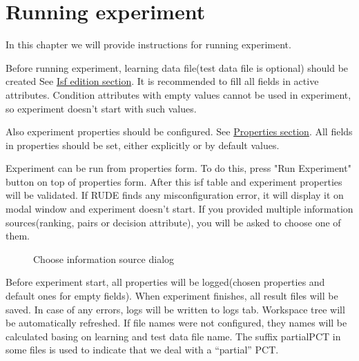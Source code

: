 \section{Running experiment}\label{section:experiment-running}

In this chapter we will provide instructions for running experiment.

Before running experiment, learning data file(test data file is optional) should be created See \hyperref[section:isf-table]{Isf edition section}. It is recommended to fill all fields in active attributes. Condition attributes with empty values cannot be used in experiment, so experiment doesn't start with such values.

Also experiment properties should be configured. See \hyperref[section:properties]{Properties section}. All fields in properties should be set, either explicitly or by default values.

Experiment can be run from properties form. To do this, press "Run Experiment" button on top of properties form. After this isf table and experiment properties will be validated. If RUDE finds any misconfiguration error, it will display it on modal window and experiment doesn't start. If you provided multiple information sources(ranking, pairs or decision attribute), you will be asked to choose one of them.

\begin{figure*}[!ht] 
	\centering
	\caption{Choose information source dialog}
\end{figure*}

Before experiment start, all properties will be logged(chosen properties and default ones for empty fields). When experiment finishes, all result files will be saved. In case of any errors, logs will be written to logs tab. Workspace tree will be automatically refreshed. If file names were not configured, they names will be calculated basing on learning and test data file name. The suffix partialPCT in some files is used to indicate that we deal with a “partial” PCT.

\vfill\newpage